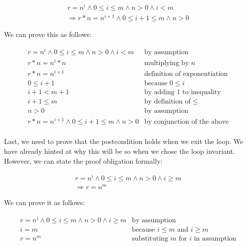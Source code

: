 \documentclass[11pt]{article}
\begin{document}
\[
\begin{array}{l}
r=n^i \land 0 \le i \le m \land n > 0  \land i < m\\
\Rightarrow r*n=n^{i+1} \land 0 \le i+1 \le m \land n > 0
\end{array}
\]

We can prove this as follows:

\[
\begin{array}{ll}
r=n^i \land 0 \le i \le m \land n > 0  \land i < m & \mbox{by assumption}\\
r*n=n^i*n & \mbox{multiplying by $n$}\\
r*n=n^{i+1} & \mbox{definition of exponentiation}\\
0 \le i+1 & \mbox{because $0 \le i$}\\
i+1 < m+1 & \mbox{by adding 1 to inequality}\\
i+1 \le m & \mbox{by definition of $\le$}\\
n>0 & \mbox{by assumption}\\
r*n=n^{i+1} \land 0 \le i+1 \le m \land n > 0& \mbox{by conjunction of the above}\\
\end{array}
\]

Last, we need to prove that the postcondition holds when we exit the
loop.  We have already hinted at why this will be so when we chose the
loop invariant.  However, we can state the proof obligation formally:

\[
\begin{array}{l}
r=n^i \land 0 \le i \le m \land n > 0  \land i \ge m\\
\Rightarrow r=n^m
\end{array}
\]

We can prove it as follows:

\[
\begin{array}{ll}
r=n^i \land 0 \le i \le m \land n > 0  \land i \ge m & \mbox{by assumption}\\
i = m & \mbox{because $i \le m$ and $i \ge m$}\\
r=n^m & \mbox{substituting $m$ for $i$ in assumption}\\
\end{array}
\]

\end{document}
